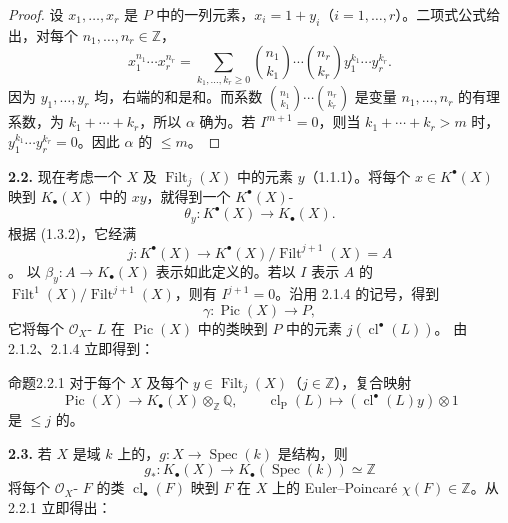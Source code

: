 \begin{proof}
设 $x_1,\ldots,x_r$ 是 $P$ 中的一列元素，$x_i=1+y_i$（$i=1,\ldots,r$）。二项式公式给出，对每个 $n_1,\ldots,n_r\in\mathbb Z$，
\[x_1^{n_1}\cdots x_r^{n_r}=\sum_{k_1,\ldots,k_r\geq0}\binom{n_1}{k_1}\cdots\binom{n_r}{k_r}y_1^{k_1}\cdots y_r^{k_r}.\tag{2.1.5}\]
因为 $y_1,\ldots,y_r$ 均，右端的和是和。而系数 $\binom{n_1}{k_1}\cdots\binom{n_r}{k_r}$ 是变量 $n_1,\ldots,n_r$ 的有理系数，为 $k_1+\cdots+k_r$，所以 $\alpha$ 确为。若 $I^{m+1}=0$，则当 $k_1+\cdots+k_r>m$ 时，$y_1^{k_1}\cdots y_r^{k_r}=0$。因此 $\alpha$ 的 $\leq m$。
\end{proof}
\textbf{2.2.} 现在考虑一个   $X$ 及 $\operatorname{Filt}_j(X)$ 中的元素 $y$（1.1.1）。将每个 $x\in K^\bullet(X)$ 映到 $K_\bullet(X)$ 中的 $xy$，就得到一个 $K^\bullet(X)$-
\[\theta_y:K^\bullet(X)\longrightarrow K_\bullet(X).\]
根据 (1.3.2)，它经满
\[j:K^\bullet(X)\longrightarrow K^\bullet(X)/\operatorname{Filt}^{j+1}(X)=A\]
。
以 $\beta_y:A\longrightarrow K_\bullet(X)$ 表示如此定义的。若以 $I$ 表示 $A$ 的 $\operatorname{Filt}^1(X)/\operatorname{Filt}^{j+1}(X)$，则有 $I^{j+1}=0$。沿用 2.1.4 的记号，得到
\[\gamma:\operatorname{Pic}(X)\longrightarrow P,\]
它将每个 $\mathcal O_X$- $L$ 在 $\operatorname{Pic}(X)$ 中的类映到 $P$ 中的元素 $j(\operatorname{cl}^\bullet(L))$。
由 2.1.2、2.1.4 立即得到：
\begin{SGAresult}{命题}{2.2.1}
对于每个   $X$ 及每个 $y\in\operatorname{Filt}_j(X)$（$j\in\mathbb Z$），复合映射
\[\operatorname{Pic}(X)\longrightarrow K_\bullet(X)\otimes_{\mathbb Z}\mathbb Q,\qquad\operatorname{cl}_{\mathrm P}(L)\longmapsto(\operatorname{cl}^\bullet(L)y)\otimes1\]
是 $\leq j$ 的。
\end{SGAresult}
\textbf{2.3.} 若 $X$ 是域 $k$ 上的，$g:X\longrightarrow\operatorname{Spec}(k)$ 是结构，则
\[g_*:K_\bullet(X)\longrightarrow K_\bullet(\operatorname{Spec}(k))\simeq\mathbb Z\]
将每个 $\mathcal O_X$- $F$ 的类 $\operatorname{cl}_\bullet(F)$ 映到 $F$ 在 $X$ 上的 Euler--Poincaré  $\chi(F)\in\mathbb Z$。从 2.2.1 立即得出：
